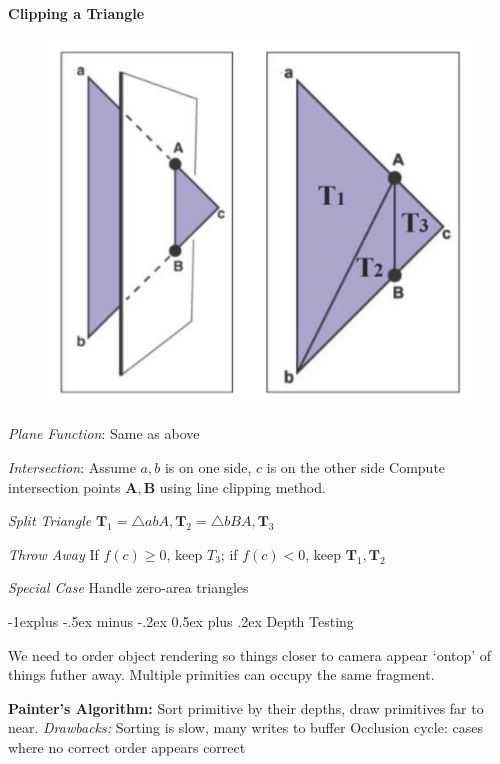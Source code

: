 \documentclass[letterpaper, 8pt]{extarticle}
\makeatletter
\renewcommand{\section}{\@startsection{section}{1}{0mm}%
                                {-1explus -.5ex minus -.2ex}%
                                {0.5ex plus .2ex}%
                                {\normalfont\small\bfseries}}
\makeatother
\begin{document}
\begin{multicols*}{4}
\textbf{Clipping a Triangle}
\begin{figure}[!ht]
    \includegraphics[width=\linewidth]{triangle-clipping.png}
\end{figure}

\textit{Plane Function}:
Same as above

\textit{Intersection}:
Assume \(a, b\) is on one side, \(c\) is on the other side
Compute intersection points \(\mathbf{A}, \mathbf{B}\) using line clipping method.

\textit{Split Triangle}
\(\mathbf{T}_1=\triangle abA, \mathbf{T}_2=\triangle bBA, \mathbf{T}_3\)

\textit{Throw Away}
If \(f(c) \geq 0\), keep \(T_3\); if \(f(c) < 0\), keep \(\mathbf{T}_1, \mathbf{T}_2\)

\textit{Special Case}
Handle zero-area triangles

\section{Depth Testing}

We need to order object rendering so things closer to camera appear `ontop' of things futher away.
Multiple primities can occupy the same fragment.

\textbf{Painter's Algorithm:} Sort primitive by their depths, draw primitives far to near. \textit{Drawbacks:} Sorting is slow, many writes to buffer
Occlusion cycle: cases where no correct order appears correct



\end{multicols*}
\end{document}
